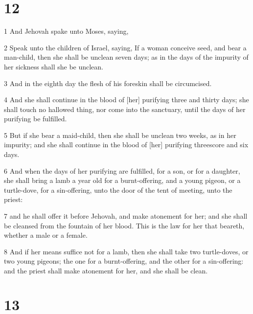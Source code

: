 \chapter{12}

\par 1 And Jehovah spake unto Moses, saying,
\par 2 Speak unto the children of Israel, saying, If a woman conceive seed, and bear a man-child, then she shall be unclean seven days; as in the days of the impurity of her sickness shall she be unclean.
\par 3 And in the eighth day the flesh of his foreskin shall be circumcised.
\par 4 And she shall continue in the blood of [her] purifying three and thirty days; she shall touch no hallowed thing, nor come into the sanctuary, until the days of her purifying be fulfilled.
\par 5 But if she bear a maid-child, then she shall be unclean two weeks, as in her impurity; and she shall continue in the blood of [her] purifying threescore and six days.
\par 6 And when the days of her purifying are fulfilled, for a son, or for a daughter, she shall bring a lamb a year old for a burnt-offering, and a young pigeon, or a turtle-dove, for a sin-offering, unto the door of the tent of meeting, unto the priest:
\par 7 and he shall offer it before Jehovah, and make atonement for her; and she shall be cleansed from the fountain of her blood. This is the law for her that beareth, whether a male or a female.
\par 8 And if her means suffice not for a lamb, then she shall take two turtle-doves, or two young pigeons; the one for a burnt-offering, and the other for a sin-offering: and the priest shall make atonement for her, and she shall be clean.

\chapter{13}

